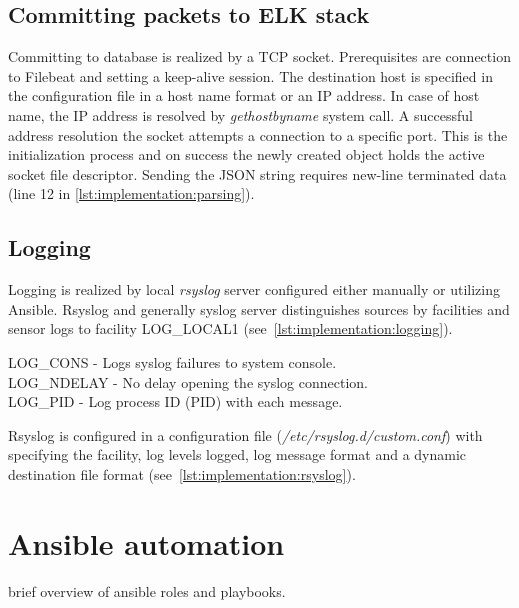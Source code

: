 \documentclass[12pt,a4paper,twoside]{report}
\begin{document}
		\subsection{Committing packets to ELK stack} \label{implementation:sensor:commit}
			Committing to database is realized by a TCP socket. Prerequisites are connection to Filebeat and setting a keep-alive session. The destination host is specified in the configuration file in a host name format or an IP address. In case of host name, the IP address is resolved by \emph{gethostbyname} system call. A successful address resolution the socket attempts a connection to a specific port. This is the initialization process and on success the newly created object holds the active socket file descriptor. Sending the JSON string requires new-line terminated data (line 12 in \autoref{lst:implementation:parsing}).	
		\subsection{Logging} \label{implementation:sensor:logging}
			Logging is realized by local \emph{rsyslog} server configured either manually or utilizing Ansible. Rsyslog and generally syslog server distinguishes sources by facilities \cite{man:syslog} and sensor logs to facility LOG\_LOCAL1 (see~\autoref{lst:implementation:logging}).
			
			LOG\_CONS - Logs syslog failures to system console.\\
			LOG\_NDELAY - No delay opening the syslog connection.\\
			LOG\_PID - Log process ID (PID) with each message.\par
			Rsyslog is configured in a configuration file (\emph{/etc/rsyslog.d/custom.conf}) with specifying the facility, log levels logged, log message format and a dynamic destination file format (see~\autoref{lst:implementation:rsyslog}).
			
		
	\section{Ansible automation} \label{implementation:ansible}
		brief overview of ansible roles and playbooks.

\newpage


\end{document}
